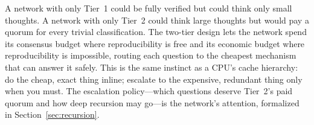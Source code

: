 A network with only Tier~1 could be fully verified but could think only small thoughts. A network with only Tier~2 could think large thoughts but would pay a quorum for every trivial classification. The two-tier design lets the network spend its consensus budget where reproducibility is free and its economic budget where reproducibility is impossible, routing each question to the cheapest mechanism that can answer it safely. This is the same instinct as a CPU's cache hierarchy: do the cheap, exact thing inline; escalate to the expensive, redundant thing only when you must. The escalation policy---which questions deserve Tier~2's paid quorum and how deep recursion may go---is the network's attention, formalized in Section~\ref{sec:recursion}.

